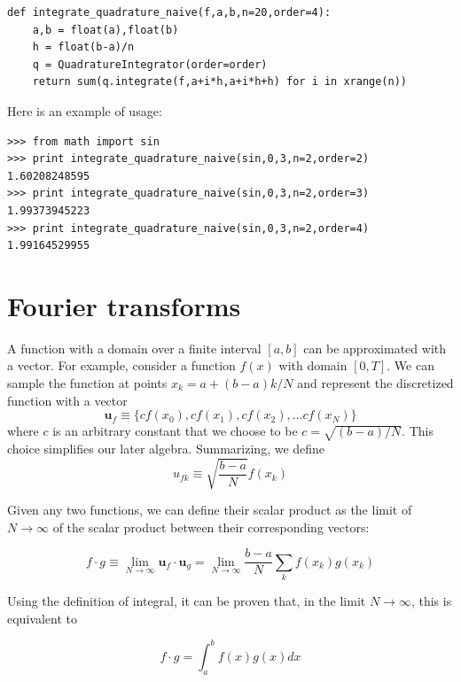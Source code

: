 \documentclass[justified,sixbynine]{tufte-book}
\def\ft{\small\tt}
\theoremstyle{plain}%
\theoremstyle{definition}
\theoremstyle{remark}
\begin{document}
\begin{fullwidth}
\begin{lstlisting}[caption={in file: {\ft nlib.py}}]
def integrate_quadrature_naive(f,a,b,n=20,order=4):
    a,b = float(a),float(b)
    h = float(b-a)/n
    q = QuadratureIntegrator(order=order)
    return sum(q.integrate(f,a+i*h,a+i*h+h) for i in xrange(n))
\end{lstlisting}

Here is an example of usage:

\begin{lstlisting}[caption={in file: {\ft nlib.py}}]
>>> from math import sin
>>> print integrate_quadrature_naive(sin,0,3,n=2,order=2)
1.60208248595
>>> print integrate_quadrature_naive(sin,0,3,n=2,order=3)
1.99373945223
>>> print integrate_quadrature_naive(sin,0,3,n=2,order=4)
1.99164529955
\end{lstlisting}

\newpage
\section{Fourier transforms}

A function with a domain over a finite interval $[a,b]$ can be approximated with a vector. For example, consider a function $f(x)$ with domain $[0,T]$. We can sample the function at points $x_k = a+(b-a)k/N$ and represent the discretized function with a vector
\begin{equation}
\mathbf{u}_f \equiv \{cf(x_0), cf(x_1), cf(x_2), \dots cf(x_N)\}
\end{equation}
where $c$ is an arbitrary constant that we choose to be $c=\sqrt{(b-a)/N}$. This choice simplifies our later algebra.
Summarizing, we define
\begin{equation}
u_{fk} \equiv \sqrt{\frac{b-a}{N}}f(x_k)
\end{equation}

Given any two functions, we can define their scalar product as the limit of $N\rightarrow\infty$ of the scalar product between their corresponding vectors:

\begin{equation}
f \cdot g \equiv \lim_{N\rightarrow\infty} \mathbf{u}_f \cdot \mathbf{u}_g =
\lim_{N\rightarrow\infty} \frac{b-a}{N} \sum_k f(x_k) g(x_k)
\end{equation}

Using the definition of integral, it can be proven that, in the limit $N\rightarrow\infty$, this is equivalent to

\begin{equation}
f \cdot g = \int_a^b f(x) g(x) dx
\end{equation}


\end{fullwidth}
\end{document}
